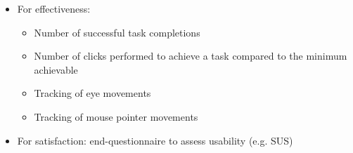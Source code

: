 \documentclass[twocolumn, letterpaper,13pt]{scrartcl}
\begin{document}
    \begin{itemize}
        \item For effectiveness: 
        \begin{itemize}
            \item Number of successful task completions
            \item Number of clicks performed to achieve a task compared to the minimum achievable
            \item Tracking of eye movements
            \item Tracking of mouse pointer movements
        \end{itemize}
        \item For satisfaction: end-questionnaire to assess usability (e.g. SUS)
    \end{itemize}
    
\end{document}
